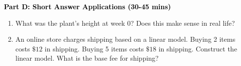\documentclass[12pt, letterpaper, fleqn]{article}
\begin{document}
\newpage

\begin{tcolorbox}[colback=customteal!20]
\large\textcolor{black}{\textbf{Part D: Short Answer Applications (30-45 mins)}}
\end{tcolorbox}

\vspace{3mm}

\begin{enumerate}[itemsep=4.2cm, leftmargin=0.6cm, resume]
\item What was the plant's height at week 0? Does this make sense in real life?
\item An online store charges shipping based on a linear model. Buying 2 items costs $\$12$ in shipping. Buying 5 items costs $\$18$ in shipping. Construct the linear model. What is the base fee for shipping?
\end{enumerate}
\end{document}
